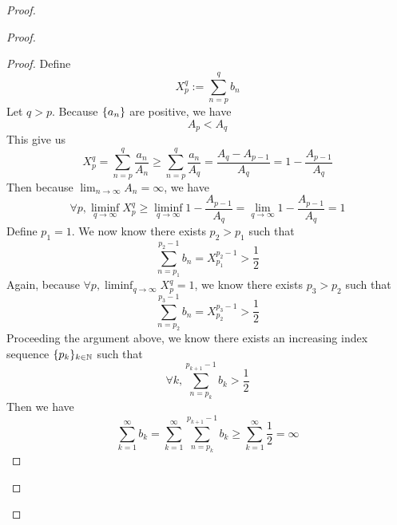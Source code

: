 \documentclass{report}
\begin{document}
\begin{proof}
\begin{proof}
\begin{proof}
Define
\begin{equation}
X^q_p:=\sum_{n=p}^q b_n
\end{equation}
Let $q>p$. Because  $\{ a_n \}$ are positive, we have 
\begin{equation}
A_p<A_q
\end{equation}
This give us
\begin{equation}
X_p^q=\sum_{n=p}^q \frac{a_n}{A_n}\geq \sum_{n=p}^q \frac{a_n}{A_q}=\frac{A_q-A_{p-1}}{A_q}=1-\frac{A_{p-1}}{A_q}
\end{equation}
Then because $\lim_{n\to\infty}A_n=\infty$, we have
\begin{equation}
\forall p,\liminf_{q\to\infty}X_p^q\geq \liminf_{q\to\infty} 1-\frac{A_{p-1}}{A_q} =\lim_{q\to\infty}1-\frac{A_{p-1}}{A_q}=1
\end{equation}
Define $p_1=1$. We now know there exists $p_2>p_1$ such that
\begin{equation}
\sum_{n=p_1}^{p_2-1} b_n= X_{p_1}^{p_2-1}>\frac{1}{2}
\end{equation}
Again, because $\forall p,\liminf_{q\to\infty} X_p^q=1$, we know there exists $p_3>p_2$ such that
 \begin{equation}
\sum_{n=p_2}^{p_3-1} b_n=X_{p_2}^{p_3-1} >\frac{1}{2}
\end{equation}
Proceeding the argument above, we know there exists an increasing index sequence $\{ p_k \}_{k\in\mathbb{N}}$ such that 
\begin{equation}
\forall k,\sum_{n=p_k}^{p_{k+1}-1} b_k>\frac{1}{2}
\end{equation}
Then we have
\begin{equation}
\sum_{k=1}^\infty b_k=  \sum_{k=1}^\infty \sum_{n=p_k}^{p_{k+1}-1} b_k\geq \sum_{k=1}^\infty \frac{1}{2}=\infty
\end{equation}

\end{proof}


\end{proof}
\end{proof}
\end{document}
